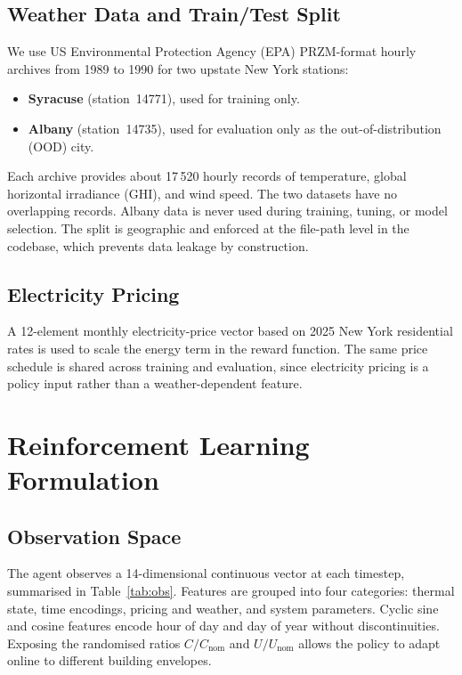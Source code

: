 \documentclass[conference]{IEEEtran}
\newcommand{\acOOD}{out-of-distribution (OOD)}
\newcommand{\acGHI}{global horizontal irradiance (GHI)}
\begin{document}
\subsection{Weather Data and Train/Test Split}
\label{subsec:weather-data}
We use US Environmental Protection Agency (EPA) PRZM-format hourly archives from 1989 to 1990 for two
upstate New York stations:
\begin{itemize}
  \item \textbf{Syracuse} (station~14771), used for training only.
  \item \textbf{Albany} (station~14735), used for evaluation only as the \acOOD{} city.
\end{itemize}
Each archive provides about 17\,520 hourly records of temperature,
\acGHI{}, and wind speed. The two datasets have no overlapping records.
Albany data is never used during training, tuning, or model selection. The
split is geographic and enforced at the file-path level in the codebase, which
prevents data leakage by construction.

\subsection{Electricity Pricing}
\label{subsec:pricing}
A 12-element monthly electricity-price vector based on 2025 New York
residential rates is used to scale the energy term in the reward
function. The same price schedule is shared across training and
evaluation, since electricity pricing is a policy input rather than a
weather-dependent feature.

\section{Reinforcement Learning Formulation}
\label{sec:rl-formulation}

\subsection{Observation Space}
\label{subsec:state-space}
The agent observes a 14-dimensional continuous vector at each timestep,
summarised in Table~\ref{tab:obs}. Features are grouped into four
categories: thermal state, time encodings, pricing and weather, and
system parameters. Cyclic sine and cosine features encode hour of day and
day of year without discontinuities. Exposing the randomised ratios
$C/C_{\text{nom}}$ and $U/U_{\text{nom}}$ allows the policy
to adapt online to different building envelopes.
\end{document}
